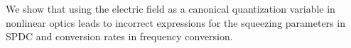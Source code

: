 We show that using the electric field as a canonical quantization variable in nonlinear optics leads to incorrect expressions for the squeezing parameters in SPDC and conversion rates in frequency conversion.
